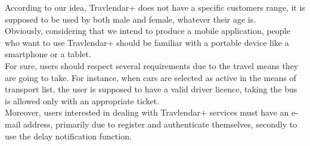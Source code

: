 According to our idea, Travlendar+ does not have a specific customers range, it is supposed to be used by both male and female, whatever their age is.\\
Obviously, considering that we intend to produce a mobile application, people who want to use Travlendar+ should be familiar with a portable device like a smartphone or a tablet. \\
For sure, users should respect several requirements due to the travel means they are going to take. For instance, when cars are selected as active in the means of transport list, the user is supposed to have a valid driver licence, taking the bus is allowed only with an appropriate ticket.\\
Moreover, users interested in dealing with Travlendar+ services must have an e-mail address, primarily due to register and authenticate themselves, secondly to use the delay notification function.
